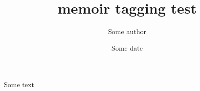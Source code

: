\documentclass{memoir}
\title{memoir tagging test}
\author{Some author} %
\date{Some date}
\begin{document}
\maketitle
Some text
\end{document}
